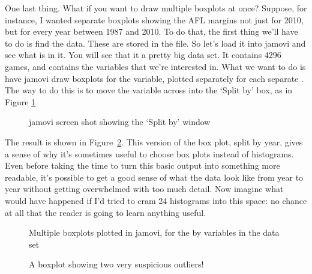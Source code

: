 
One last thing. What if you want to draw multiple boxplots at once? Suppose, for instance, I wanted separate boxplots showing the AFL margins not just for 2010, but for every year between 1987 and 2010. To do that, the first thing we'll have to do is find the data. These are stored in the  file. So let's load it into jamovi and see what is in it. You will see that it a pretty big data set. It contains 4296 games, and contains the variables that we're interested in. What we want to do is have jamovi draw boxplots for the  variable, plotted separately for each separate . The way to do this is to move the  variable across into the `Split by' box, as in Figure \ref{fig:splitfile1}

\begin{figure}[h]
\begin{center}
\caption{jamovi screen shot showing the `Split by' window}
\label{fig:splitfile1}
\HR
\end{center}
\end{figure}

The result is shown in Figure~\ref{fig:boxplot3}. This version of the box plot, split by year, gives a sense of why it's sometimes useful to choose box plots instead of histograms. Even before taking the time to turn this basic output into something more readable, it's possible to get a good sense of what the data look like from year to year without getting overwhelmed with too much detail. Now imagine what would have happened if I'd tried to cram 24 histograms into this space: no chance at all that the reader is going to learn anything useful.

\begin{figure}[h!!]
\begin{center}
\caption{Multiple boxplots plotted in jamovi, for the  by  variables in the  data set}
\label{fig:boxplot3}
\HR
\end{center}
\end{figure}



\begin{figure}[h]
\begin{center}
\caption{A boxplot showing two very suspicious outliers!}
\label{fig:boxplot4}
\HR
\end{center}
\end{figure}

